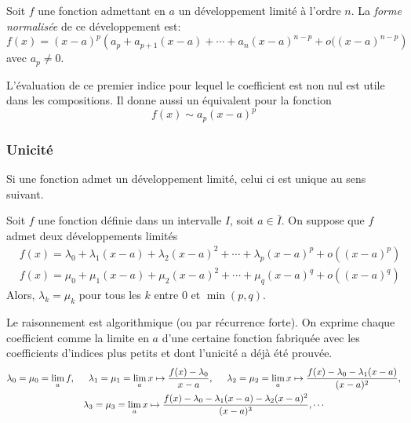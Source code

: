 \begin{defi}
Soit $f$ une fonction admettant en $a$ un développement limité à l'ordre $n$. La \emph{forme normalisée} de ce développement est:
\begin{displaymath}
f(x) = (x-a)^p\left(a_p + a_{p+1}(x-a)+\cdots + a_{n}(x-a)^{n-p} +o((x-a)^{n-p} \right)   
\end{displaymath}
avec $a_p\neq 0$.
\end{defi}
L'évaluation de ce premier indice pour lequel le coefficient est non nul est utile dans les compositions. Il donne aussi un équivalent pour la fonction
\begin{displaymath}
  f(x) \sim a_p(x-a)^p
\end{displaymath}


\subsubsection{Unicité}
Si une fonction admet un développement limité, celui ci est unique au sens suivant.
\begin{prop}
 Soit $f$ une fonction définie dans un intervalle $I$, soit $a\in\overline{I}$. On suppose que $f$ admet deux développements limités
\begin{align*}
 &f(x)=\lambda_0 + \lambda_1(x-a)+\lambda_2(x-a)^2+\cdots +\lambda_p(x-a)^p +o((x-a)^p)\\
 &f(x)=\mu_0 + \mu_1(x-a)+\mu_2(x-a)^2+\cdots +\mu_q(x-a)^q +o((x-a)^q)
\end{align*}
Alors, $\lambda_k=\mu_k$ pour tous les $k$ entre $0$ et $\min(p,q)$.
\end{prop}
\begin{demo}
Le raisonnement est algorithmique (ou par récurrence forte). On exprime chaque coefficient comme la limite en $a$ d'une certaine fonction fabriquée avec les coefficients d'indices plus petits et dont l'unicité a déjà été prouvée.
\begin{multline*}
  \lambda_0 = \mu_0 = \lim_{a}f,\hspace{0.5cm} \lambda_1 = \mu_1 = \lim_{a}x\mapsto \frac{f(x) - \lambda_0}{x-a},\hspace{0.5cm}
\lambda_2 = \mu_2 = \lim_{a}x\mapsto \frac{f(x) - \lambda_0-\lambda_1(x-a)}{(x-a)^2},\\
\lambda_3 = \mu_3 = \lim_{a}x\mapsto \frac{f(x) - \lambda_0-\lambda_1(x-a) - \lambda_2(x-a)^2}{(x-a)^3}, \cdots
\end{multline*}
\end{demo}

